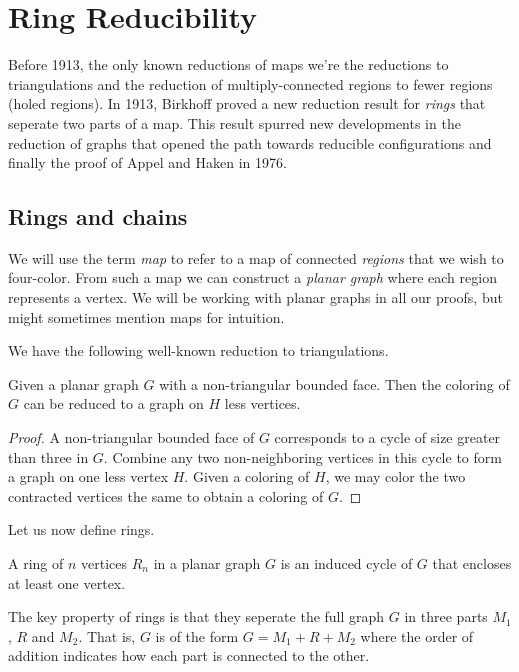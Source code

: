 \section{Ring Reducibility}
\label{sec:birkhoff}

Before 1913, the only known reductions of maps we're the reductions to triangulations and the reduction of multiply-connected regions to fewer regions (holed regions). In 1913, Birkhoff \cite{birkhoff} proved a new reduction result for \textit{rings} that seperate two parts of a map. This result spurred new developments in the reduction of graphs that opened the path towards reducible configurations and finally the proof of Appel and Haken in 1976.

\subsection{Rings and chains}

We will use the term \textit{map} to refer to a map of connected \textit{regions} that we wish to four-color. From such a map we can construct a \textit{planar graph} where each region represents a vertex. We will be working with planar graphs in all our proofs, but might sometimes mention maps for intuition.

We have the following well-known reduction to triangulations.

\begin{theorem}
\label{thm:triang}
    Given a planar graph $G$ with a non-triangular bounded face. Then the coloring of $G$ can be reduced to a graph on $H$ less vertices.
\end{theorem}
\begin{proof}
    A non-triangular bounded face of $G$ corresponds to a cycle of size greater than three in $G$. Combine any two non-neighboring vertices in this cycle to form a graph on one less vertex $H$. Given a coloring of $H$, we may color the two contracted vertices the same to obtain a coloring of $G$.
\end{proof}

Let us now define rings.

\begin{definition}
    A ring of $n$ vertices $R_n$ in a planar graph $G$ is an induced cycle of $G$ that encloses at least one vertex.
\end{definition}

The key property of rings is that they seperate the full graph $G$ in three parts $M_1$, $R$ and $M_2$. That is, $G$ is of the form $G = M_1 + R + M_2$ where the order of addition indicates how each part is connected to the other.

